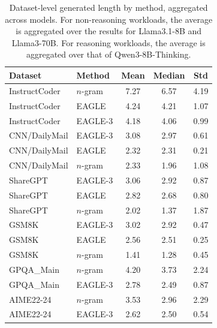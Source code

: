 \documentclass{article}
\begin{document}
\begin{table}[h!]
\centering
\begin{tabular}{llccc}
\toprule
Dataset & Method & Mean & Median & Std \\
\midrule
InstructCoder & $n$-gram & 7.27 & 6.57 & 4.19 \\
InstructCoder & EAGLE & 4.24 & 4.21 & 1.07 \\
InstructCoder & EAGLE-3 & 4.18 & 4.06 & 0.99 \\
CNN/DailyMail & EAGLE-3 & 3.08 & 2.97 & 0.61 \\
CNN/DailyMail & EAGLE & 2.32 & 2.31 & 0.21 \\
CNN/DailyMail & $n$-gram & 2.33 & 1.96 & 1.08 \\
ShareGPT & EAGLE-3 & 3.06 & 2.92 & 0.87 \\
ShareGPT & EAGLE & 2.82 & 2.68 & 0.80 \\
ShareGPT & $n$-gram & 2.02 & 1.37 & 1.87 \\
GSM8K & EAGLE-3 & 3.02 & 2.92 & 0.47 \\
GSM8K & EAGLE & 2.56 & 2.51 & 0.25 \\
GSM8K & $n$-gram & 1.41 & 1.28 & 0.45 \\
\midrule
GPQA\_Main & $n$-gram & 4.20 & 3.73 & 2.24 \\
GPQA\_Main & EAGLE-3 & 2.78 & 2.49 & 0.87 \\
AIME22-24 & $n$-gram & 3.53 & 2.96 & 2.29 \\
AIME22-24 & EAGLE-3 & 2.62 & 2.50 & 0.54 \\
\bottomrule
\end{tabular}
\caption{Dataset-level generated length by method, aggregated across models. For non-reasoning workloads, the average is aggregated over the results for Llama3.1-8B and Llama3-70B. For reasoning workloads, the average is aggregated over that of Qwen3-8B-Thinking.}
\label{tab:dataset_agg_by_method}
\end{table}

\clearpage
\end{document}
